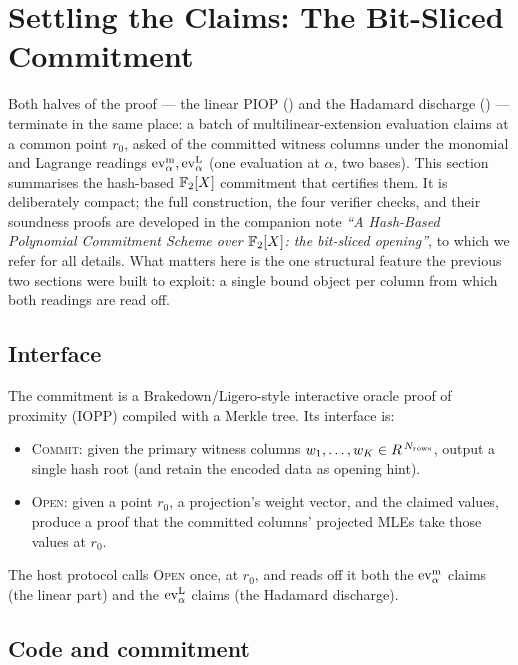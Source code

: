 \section{Settling the Claims: The Bit-Sliced Commitment}
\label{sec:commitment}

Both halves of the proof --- the linear PIOP () and the
Hadamard discharge () --- terminate in the same
place: a batch of multilinear-extension evaluation claims at a common point
$r_0$, asked of the committed witness columns under the monomial and
Lagrange readings $\operatorname{ev}^{\mathrm{m}}_{\alpha},\operatorname{ev}^{\mathrm{L}}_{\alpha}$ (one evaluation at $\alpha$, two bases). This section summarises the hash-based $\mathbb{F}_2[X]$
commitment that certifies them. It is deliberately compact; the full
construction, the four verifier checks, and their soundness proofs are
developed in the companion note \emph{``A Hash-Based Polynomial Commitment
Scheme over $\mathbb{F}_2[X]$: the bit-sliced opening''}, to which we refer for
all details. What matters here is the one structural feature the previous
two sections were built to exploit: a single bound object per column from
which both readings are read off.

\subsection{Interface}
\label{sec:pcs-interface}

The commitment is a Brakedown/Ligero-style interactive oracle proof of
proximity (IOPP) compiled with a Merkle tree. Its interface is:
\begin{itemize}[leftmargin=2em]
  \item \textsc{Commit}: given the primary witness columns
    $w_1,\dots,w_K\in R^{\,N_{\mathrm{rows}}}$, output a single hash
    root (and retain the encoded data as opening hint).
  \item \textsc{Open}: given a point $r_0$, a projection's weight vector,
    and the claimed values, produce a proof that the committed columns'
    projected MLEs take those values at $r_0$.
\end{itemize}
The host protocol calls \textsc{Open} once, at $r_0$, and reads off it both
the $\operatorname{ev}^{\mathrm{m}}_{\alpha}$ claims (the linear part) and the $\operatorname{ev}^{\mathrm{L}}_{\alpha}$ claims (the Hadamard
discharge).

\subsection{Code and commitment}
\label{sec:pcs-code}

